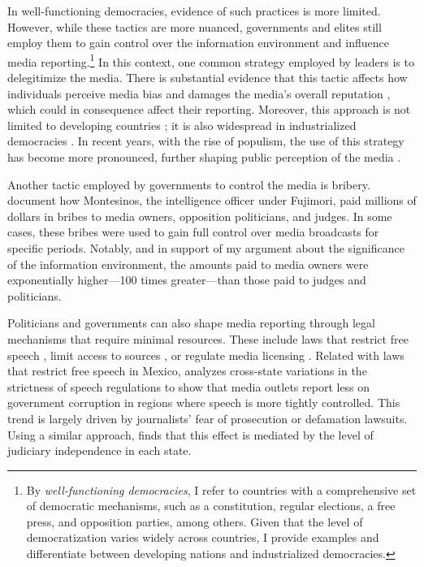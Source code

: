 In well-functioning democracies, evidence of such practices is more limited. However, while these tactics are more nuanced, governments and elites still employ them to gain control over the information environment and influence media reporting.\footnote{By \textit{well-functioning democracies}, I refer to countries with a comprehensive set of democratic mechanisms, such as a constitution, regular elections, a free press, and opposition parties, among others. Given that the level of democratization varies widely across countries, I provide examples and differentiate between developing nations and industrialized democracies.} In this context, one common strategy employed by leaders is to delegitimize the media. There is substantial evidence that this tactic affects how individuals perceive media bias and damages the media’s overall reputation \citep{PercMedia-Egelholfer-JoComm, PolNews-Smith-JoPressPol}, which could in consequence affect their reporting. Moreover, this approach is not limited to developing countries \citep{JournIndia-Bhat-Dig, ThugMex-VictorHugo-JourPract}; it is also widespread in industrialized democracies \citep{KoreaJour-Shin-Journalism, PressCriticism-Carlson-Journalism}. In recent years, with the rise of populism, the use of this strategy has become more pronounced, further shaping public perception of the media \citep{PolEconPop-Guriev-JEL}.

Another tactic employed by governments to control the media is bribery. \cite{Peru-Macmillan-JEP} document how Montesinos, the intelligence officer under Fujimori, paid millions of dollars in bribes to media owners, opposition politicians, and judges. In some cases, these bribes were used to gain full control over media broadcasts for specific periods. Notably, and in support of my argument about the significance of the information environment, the amounts paid to media owners were exponentially higher—100 times greater—than those paid to judges and politicians.

Politicians and governments can also shape media reporting through legal mechanisms that require minimal resources. These include laws that restrict free speech \citep{MexicanPressStanigAJPS, Journalism-Salazar-RevMex}, limit access to sources \citep{Kisha-UoNott, Kisha-Freedom}, or regulate media licensing \citep{PolicyBrief-MediaRegulation}. Related with laws that restrict free speech in Mexico, \cite{MexicanPressStanigAJPS} analyzes cross-state variations in the strictness of speech regulations to show that media outlets report less on government corruption in regions where speech is more tightly controlled. This trend is largely driven by journalists' fear of prosecution or defamation lawsuits. Using a similar approach, \cite{Journalism-Salazar-RevMex} finds that this effect is mediated by the level of judiciary independence in each state.

